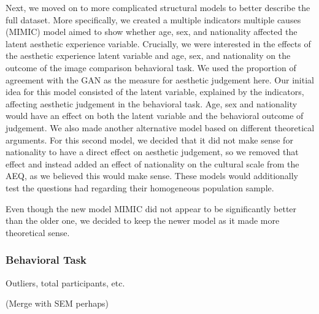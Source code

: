 \documentclass[../main.tex]{subfiles}
\begin{document}
	Next, we moved on to more complicated structural models to better describe the full dataset. More specifically, we created a multiple indicators multiple causes (MIMIC) model aimed to show whether age, sex, and nationality affected the latent aesthetic experience variable. Crucially, we were interested in the effects of the aesthetic experience latent variable and age, sex, and nationality on the outcome of the image comparison behavioral task. We used the proportion of agreement with the GAN as the measure for aesthetic judgement here. Our initial idea for this model consisted of the latent variable, explained by the indicators, affecting aesthetic judgement in the behavioral task. Age, sex and nationality would have an effect on both the latent variable and the behavioral outcome of judgement. We also made another alternative model based on different theoretical arguments. For this second model, we decided that it did not make sense for nationality to have a direct effect on aesthetic judgement, so we removed that effect and instead added an effect of nationality on the cultural scale from the AEQ, as we believed this would make sense. These models would additionally test the questions \textcite{wanzerExperiencingFlowViewing2020} had regarding their homogeneous population sample. 
	
	Even though the new model MIMIC did not appear to be significantly better than the older one, we decided to keep the newer model as it made more theoretical sense.
	
	
	
	\subsubsection{Behavioral Task}
	Outliers, total participants, etc.
	
	(Merge with SEM perhaps)
	
\end{document}
